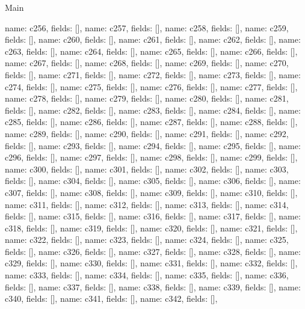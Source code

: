 \begin{lexlean}{Main}
\begin{semanticmodule}
{    {name: c256, fields: []},
    {name: c257, fields: []},
    {name: c258, fields: []},
    {name: c259, fields: []},
    {name: c260, fields: []},
    {name: c261, fields: []},
    {name: c262, fields: []},
    {name: c263, fields: []},
    {name: c264, fields: []},
    {name: c265, fields: []},
    {name: c266, fields: []},
    {name: c267, fields: []},
    {name: c268, fields: []},
    {name: c269, fields: []},
    {name: c270, fields: []},
    {name: c271, fields: []},
    {name: c272, fields: []},
    {name: c273, fields: []},
    {name: c274, fields: []},
    {name: c275, fields: []},
    {name: c276, fields: []},
    {name: c277, fields: []},
    {name: c278, fields: []},
    {name: c279, fields: []},
    {name: c280, fields: []},
    {name: c281, fields: []},
    {name: c282, fields: []},
    {name: c283, fields: []},
    {name: c284, fields: []},
    {name: c285, fields: []},
    {name: c286, fields: []},
    {name: c287, fields: []},
    {name: c288, fields: []},
    {name: c289, fields: []},
    {name: c290, fields: []},
    {name: c291, fields: []},
    {name: c292, fields: []},
    {name: c293, fields: []},
    {name: c294, fields: []},
    {name: c295, fields: []},
    {name: c296, fields: []},
    {name: c297, fields: []},
    {name: c298, fields: []},
    {name: c299, fields: []},
    {name: c300, fields: []},
    {name: c301, fields: []},
    {name: c302, fields: []},
    {name: c303, fields: []},
    {name: c304, fields: []},
    {name: c305, fields: []},
    {name: c306, fields: []},
    {name: c307, fields: []},
    {name: c308, fields: []},
    {name: c309, fields: []},
    {name: c310, fields: []},
    {name: c311, fields: []},
    {name: c312, fields: []},
    {name: c313, fields: []},
    {name: c314, fields: []},
    {name: c315, fields: []},
    {name: c316, fields: []},
    {name: c317, fields: []},
    {name: c318, fields: []},
    {name: c319, fields: []},
    {name: c320, fields: []},
    {name: c321, fields: []},
    {name: c322, fields: []},
    {name: c323, fields: []},
    {name: c324, fields: []},
    {name: c325, fields: []},
    {name: c326, fields: []},
    {name: c327, fields: []},
    {name: c328, fields: []},
    {name: c329, fields: []},
    {name: c330, fields: []},
    {name: c331, fields: []},
    {name: c332, fields: []},
    {name: c333, fields: []},
    {name: c334, fields: []},
    {name: c335, fields: []},
    {name: c336, fields: []},
    {name: c337, fields: []},
    {name: c338, fields: []},
    {name: c339, fields: []},
    {name: c340, fields: []},
    {name: c341, fields: []},
    {name: c342, fields: []},
}
\end{semanticmodule}
\end{lexlean}
